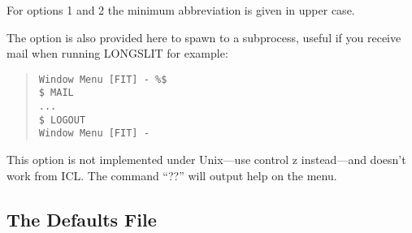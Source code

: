 For options 1 and 2 the minimum abbreviation is given in upper case.

The option is also provided here to spawn to a subprocess, useful if you
receive mail when running LONGSLIT for example:
\begin{quote}\begin{verbatim}
Window Menu [FIT] - %$
$ MAIL
...
$ LOGOUT
Window Menu [FIT] -
\end{verbatim}\end{quote}
This option is not implemented under Unix---use control z instead---and
doesn't work from ICL.
The command ``??'' will output help on the menu.

\subsection{The Defaults File}
\label{deffile}

